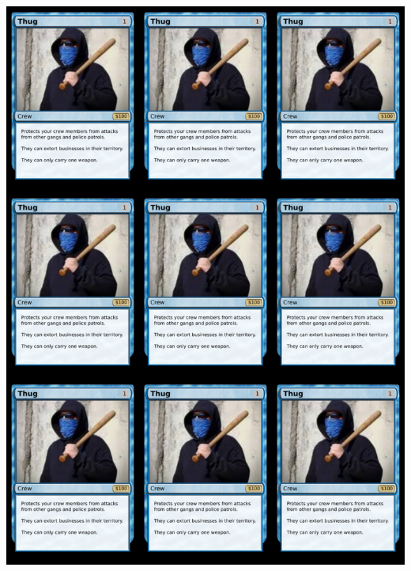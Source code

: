 \documentclass[a4paper]{article}
\begin{document}
\begin{center}
	\centering
	\includegraphics[width=190.5mm,height=266.7mm]{output/images/front.png}
\end{center}

\newpage
\end{document}
